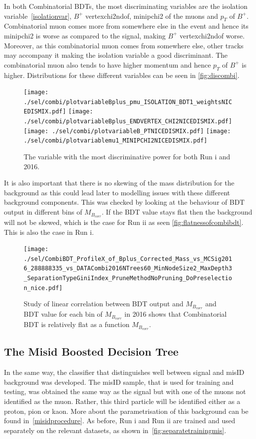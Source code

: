 In both Combinatorial BDTs, the most discriminating variables are the isolation variable~\autoref{isolationvar}, $B^{+}$ \gls{vertexchi2ndof}, \gls{minipchi2} of the muons and $p_{T}$ of $B^{+}$. Combinatorial muon comes more from somewhere else in the event and hence its \gls{minipchi2} is worse as compared to the signal, making $B^{+}$ \gls{vertexchi2ndof} worse. Moreover, as this combinatorial muon comes from somewhere else, other tracks may accompany it making the isolation variable a good discriminant. The combinatorial muon also tends to have higher momentum and hence $p_{T}$ of $B^{+}$ is higher. Distributions for these different variables can be seen in \autoref{fig:discombi}. 


\begin{figure}[ht]
\centering
	\texttt{[image: ./sel/combi/plotvariableBplus\_pmu\_ISOLATION\_BDT1\_weightsNICEDISMIX.pdf]}%
	\texttt{[image: ./sel/combi/plotvariableBplus\_ENDVERTEX\_CHI2NICEDISMIX.pdf]}%
	\newline
	\texttt{[image: ./sel/combi/plotvariableB\_PTNICEDISMIX.pdf]}%
	\texttt{[image: ./sel/combi/plotvariablemu1\_MINIPCHI2NICEDISMIX.pdf]}%
	\caption{The variable with the most discriminative power for both Run \Rn{1} and 2016.}
\label{fig:discombi}
\end{figure}


It is also important that there is no skewing of the mass distribution for the background as this could lead later to modelling issues with these different background components. This was checked by looking at the behaviour of BDT output in different bins of $M_{B_{corr}}$. If the BDT value stays flat then the background will not be skewed, which is the case for Run \Rn{2} as seen \autoref{fig:flatnessofcombibdt}. This is also the case in Run \Rn{1}. 


\begin{figure}[ht]
\centering
	\texttt{[image: ./sel/CombiBDT\_ProfileX\_of\_Bplus\_Corrected\_Mass\_vs\_MCSig2016\_288888335\_vs\_DATACombi2016NTrees60\_MinNodeSize2\_MaxDepth3\_SeparationTypeGiniIndex\_PruneMethodNoPruning\_DoPreselection\_nice.pdf]}
\caption{Study of linear correlation between BDT output and $M_{B_{corr}}$ and BDT value for each bin of $M_{B_{corr}}$ in 2016 shows that Combinatorial BDT is relatively flat as a function $M_{B_{corr}}$.}
\label{fig:flatnessofcombibdt}
\end{figure}

\subsection{The Misid Boosted Decision Tree}
\label{misidbdt}
In the same way, the classifier that distinguishes well between signal and misID background was developed. The misID sample, that is used for training and testing, was obtained the same way as the signal but with one of the muons not identified as the muon. Rather, this third particle will be identified either as a proton, pion or kaon. More about the parametrisation of this background can be found in~\autoref{misidprocedure}. As before, Run \Rn{1} and Run \Rn{2} are trained and used separately on the relevant datasets, as shown in~\autoref{fig:separatetrainingmis}. 


